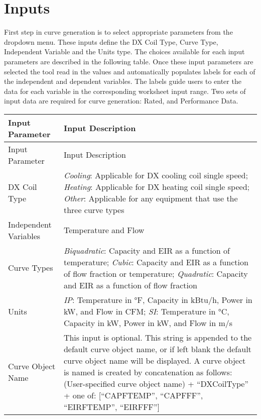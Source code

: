 \section{Inputs}\label{inputs}

First step in curve generation is to select appropriate parameters from the dropdown menu. These inputs define the DX Coil Type, Curve Type, Independent Variable and the Units type. The choices available for each input parameters are described in the following table. Once these input parameters are selected the tool read in the values and automatically populates labels for each of the independent and dependent variables. The labels guide users to enter the data for each variable in the corresponding worksheet input range. Two sets of input data are required for curve generation: Rated, and Performance Data.

\begin{longtable}{p{2in}|p{4in}}

\toprule
Input Parameter & Input Description \tabularnewline
\midrule
\endfirsthead

\toprule
Input Parameter & Input Description \tabularnewline
\midrule
\endhead 
DX Coil Type & \emph{Cooling}: Applicable for DX cooling coil single speed; 
               \emph{Heating}: Applicable for DX heating coil single speed; 
               \emph{Other}: Applicable for any equipment that use the three curve types
\tabularnewline
Independent Variables & Temperature and Flow 
\tabularnewline
Curve Types & \emph{Biquadratic}: Capacity and EIR as a function of temperature;
              \emph{Cubic}: Capacity and EIR as a function of flow fraction or temperature;
              \emph{Quadratic}: Capacity and EIR as a function of flow fraction
\tabularnewline
Units & \emph{IP}: Temperature in °F, Capacity in kBtu/h, Power in kW, and Flow in CFM;
        \emph{SI}: Temperature in °C, Capacity in kW, Power in kW, and Flow in m/s 
\tabularnewline
Curve Object Name & This input is optional. This string is appended to the default curve object name, or if left blank the default curve object name will be displayed. A curve object is named is created by concatenation as follows: (User-specified curve object name) + ``DXCoilType'' + one of: [``CAPFTEMP'', ``CAPFFF'', ``EIRFTEMP'', ``EIRFFF'']\tabularnewline
\bottomrule
\end{longtable}
